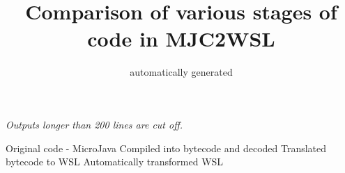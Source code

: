 \documentclass[a4paper,landscape]{article}
\title{Comparison of various stages of code in MJC2WSL}
\author{automatically generated}
\begin{document}
\maketitle

\tableofcontents

\newpage

\emph{Outputs longer than 200 lines are cut off.}

\begin{paracol}{4}
Original code - MicroJava
\switchcolumn
Compiled into bytecode and decoded
\switchcolumn
Translated bytecode to WSL
\switchcolumn
Automatically transformed WSL
\end{paracol}
\end{document}

